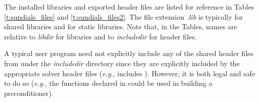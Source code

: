 The installed libraries and exported header files are listed for
reference in Tables \ref{t:sundials_files} and \ref{t:sundials_files2}.
The file extension .{\em lib}
is typically  for shared libraries and  for static libraries.
Note that, in the Tables, names are relative to {\em libdir}
for libraries and to {\em includedir} for header files.

A typical user program need not explicitly include any of the shared
{\sundials} header files from under the {\em includedir}
directory since they are explicitly included by the appropriate solver
header files ({\em e.g.},  includes
). However, it is both legal and safe to do so
({\em e.g.}, the functions declared in  
could be used in building a preconditioner).

